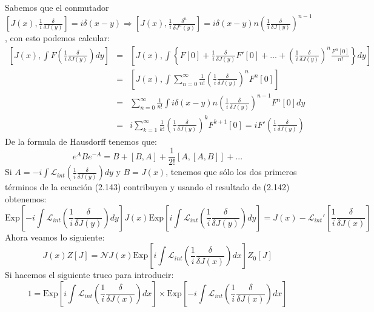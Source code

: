 Sabemos que el conmutador $\left[J(x),\frac{1}{i}\frac{\delta}{\delta J(y)}\right]=i\delta(x-y)\Rightarrow\left[J(x),\frac{1}{i}\frac{\delta^{n}}{\delta J^{n}(y)}\right]=i\delta(x-y)n\left(\frac{1}{i}\frac{\delta}{\delta J(y)}\right)^{n-1}$, con esto podemos calcular:
\begin{eqnarray}
\nonumber \left[J(x),\int F\left(\frac{1}{i}\frac{\delta}{\delta J(y)}\right)dy\right]&=&\left[J(x),\int\left\{ F[0]+\frac{1}{i}\frac{\delta}{\delta J(y)}F\prime[0]+...+\left(\frac{1}{i}\frac{\delta}{\delta J(y)}\right)^{n}\frac{F^{n}[0]}{n!}\right\} dy\right]\\
\nonumber &=& \left[J(x),\int\sum_{n=0}^{\infty}\frac{1}{n!}\left(\frac{1}{i}\frac{\delta}{\delta J(y)}\right)^{n}F^{n}[0]\right]\\
\nonumber &=& \sum_{n=0}^{\infty}\frac{1}{n!}\int i\delta(x-y)n\left(\frac{1}{i}\frac{\delta}{\delta J(y)}\right)^{n-1}F^{n}[0]dy\\
&=& i\sum_{k=1}^{\infty}\frac{1}{k!}\left(\frac{1}{i}\frac{\delta}{\delta J(y)}\right)^{k}F^{k+1}[0]=iF\prime\left(\frac{1}{i}\frac{\delta}{\delta J(y)}\right)
\end{eqnarray}
De la formula de Hausdorff tenemos que:
\begin{equation}
e^ABe^{-A}=B+[B,A]+\frac{1}{2!}[A,[A,B]]+...
\end{equation}
Si $A=-i\int\mathcal{L}_{int}\left(\frac{1}{i}\frac{\delta}{\delta J(y)}\right)dy$ y $B=J(x)$, tenemos que sólo los dos primeros términos de la ecuación (2.143) contribuyen y usando el resultado de (2.142) obtenemos:
\begin{equation}
\text{Exp}\left[-i\int\mathcal{L}_{int}\left(\frac{1}{i}\frac{\delta}{\delta J(y)}\right)dy\right]J(x)\text{Exp}\left[i\int\mathcal{L}_{int}\left(\frac{1}{i}\frac{\delta}{\delta J(y)}\right)dy\right]=J(x)-\mathcal{L}_{int}\prime\left[\frac{1}{i}\frac{\delta}{\delta J(x)}\right]
\end{equation}
Ahora veamos lo siguiente:
\begin{equation}
J(x)Z[J]=\mathcal{N}J(x)\text{Exp}\left[i\int\mathcal{L}_{int}\left(\frac{1}{i}\frac{\delta}{\delta J(x)}\right)dx\right]Z_{0}[J]
\end{equation}
Si hacemos el siguiente truco para introducir:
\begin{equation}
1=\text{Exp}\left[i\int\mathcal{L}_{int}\left(\frac{1}{i}\frac{\delta}{\delta J(x)}\right)dx\right]\times\text{Exp}\left[-i\int\mathcal{L}_{int}\left(\frac{1}{i}\frac{\delta}{\delta J(x)}\right)dx\right]
\end{equation}
